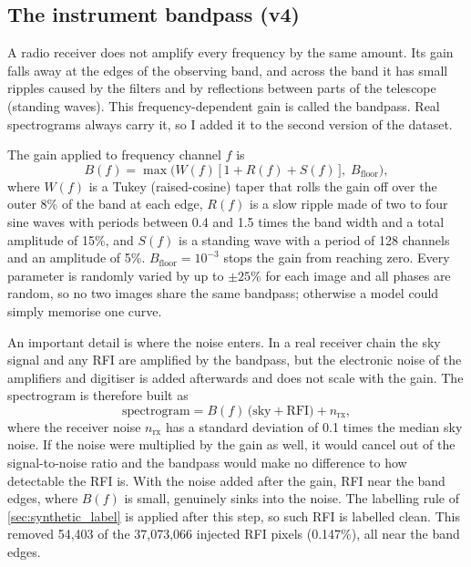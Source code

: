 \subsection{The instrument bandpass (v4)}
\label{sec:bandpass}
A radio receiver does not amplify every frequency by the same amount. Its gain
falls away at the edges of the observing band, and across the band it has
small ripples caused by the filters and by reflections between parts of the
telescope (standing waves). This frequency-dependent gain is called the
bandpass. Real spectrograms always carry it, so I added it to the second
version of the dataset.

The gain applied to frequency channel $f$ is
\begin{equation}
  B(f) = \max\Big( W(f)\,\big[\,1 + R(f) + S(f)\,\big],\; B_{\text{floor}} \Big),
  \label{eq:bandpass}
\end{equation}
where $W(f)$ is a Tukey (raised-cosine) taper that rolls the gain off over the
outer 8\% of the band at each edge, $R(f)$ is a slow ripple made of two to four
sine waves with periods between 0.4 and 1.5 times the band width and a total
amplitude of 15\%, and $S(f)$ is a standing wave with a period of 128 channels
and an amplitude of 5\%. $B_{\text{floor}} = 10^{-3}$ stops the gain from reaching
zero. Every parameter is randomly varied by up to $\pm25\%$ for each image and
all phases are random, so no two images share the same bandpass; otherwise a
model could simply memorise one curve.

An important detail is where the noise enters. In a real receiver chain the
sky signal and any RFI are amplified by the bandpass, but the electronic noise
of the amplifiers and digitiser is added afterwards and does not scale with
the gain. The spectrogram is therefore built as
\begin{equation}
  \text{spectrogram} = B(f)\,\big(\text{sky} + \text{RFI}\big) + n_{\text{rx}},
\end{equation}
where the receiver noise $n_{\text{rx}}$ has a standard deviation of 0.1 times
the median sky noise. If the noise were multiplied by the gain as well, it
would cancel out of the signal-to-noise ratio and the bandpass would make no
difference to how detectable the RFI is. With the noise added after the gain,
RFI near the band edges, where $B(f)$ is small, genuinely sinks into the noise.
The labelling rule of \cref{sec:synthetic_label} is applied after this step,
so such RFI is labelled clean. This removed 54{,}403 of the 37{,}073{,}066
injected RFI pixels (0.147\%), all near the band edges.

